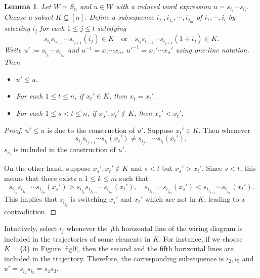\documentclass[12pt]{amsart}
\newtheorem{lemma}[theorem]{Lemma}
\theoremstyle{definition}
\theoremstyle{remark}
\begin{document}
\begin{lemma}\label{lem5.5}
Let $W = S_n$ and $u \in W$ with a reduced word expression $u = s_{i_1} \cdots s_{i_l}$. Choose a subset $K \subseteq [n]$. Define a subsequence $i_{j_1} , i_{j_2} , \cdots , i_{j_m}$ of $i_1 , \cdots , i_l$ by selecting $i_j$ for each $1 \leq j \leq l$ satisfying
\begin{equation}
s_{i_l} s_{i_{l-1}} \cdots s_{i_{j+1}} (i_j) \in K \quad \text{or} \quad s_{i_l} s_{i_{l-1}} \cdots s_{i_{j+1}} (1+ i_j ) \in K.
\end{equation}
Write $u' := s_{i_{j_1}} \cdots s_{i_{j_m}}$ and $u^{-1} = x_1 \cdots x_n$, $u'^{-1} = x_1' \cdots x_n'$ using one-line notation. Then
\begin{itemize}
\item $u' \leq u$.
\item For each $1 \leq t \leq n$, if $x_t' \in K$, then $x_t = x_t'$.
\item For each $1 \leq s < t \leq n$, if $x_s' , x_t' \notin K$, then $x_s' < x_t'$.
\end{itemize}
\end{lemma}
\begin{proof}
$u' \leq u$ is due to the construction of $u'$. Suppose $x_t' \in K$. Then whenever
\begin{equation}
s_{i_j} s_{i_{j+1}} \cdots s_{i_l}(x_t') \neq  s_{i_{j+1}} \cdots s_{i_l}(x_t'),
\end{equation}
$s_{i_j}$ is included in the construction of $u'$.

On the other hand, suppose $x_s ' , x_t' \notin K$ and $s<t$ but $x_s' > x_t'$. Since $s < t$, this means that there exists a $1 \leq k \leq m$ such that
\begin{equation}
s_{i_{j_k}} s_{i_{j_{k+1}}} \cdots s_{i_{j_m}}(x_s') > s_{i_{j_k}} s_{i_{j_{k+1}}} \cdots s_{i_{j_m}}(x_t'), \quad s_{i_{j_{k+1}}} \cdots s_{i_{j_m}}(x_s') < s_{i_{j_{k+1}}} \cdots s_{i_{j_m}}(x_t').
\end{equation}
This implies that $s_{i_{j_k}}$ is switching $x_s'$ and $x_t'$ which are not in $K$, leading to a contradiction.
\end{proof}

Intuitively, select $i_j$ whenever the $j$th horizontal line of the wiring diagram is included in the trajectories of some elements in $K$. For instance, if we choose $K = \{3\}$ in Figure \ref{fig0}, then the second and the fifth horizontal lines are included in the trajectory. Therefore, the corresponding subsequence is $i_2 , i_5$ and $u' = s_{i_2} s_{i_5} = s_4 s_3$.
\end{document}
